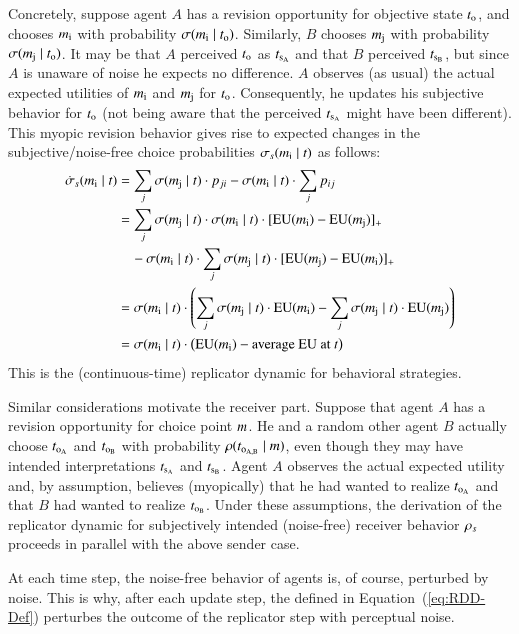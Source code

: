 \documentclass[fleqn,reqno,10pt]{article}
\newcommand{\rdd}{\acro{rdd}} %
\begin{document}
Concretely, suppose agent $A$ has a revision opportunity for objective
state $t_{\mathrm{o}}$, and chooses $m_{\mathrm{i}}$ with probability
$\sigma(m_{\mathrm{i}} \mid t_{\mathrm{o}})$. Similarly, $B$ chooses
$m_{\mathrm{j}}$ with probability $\sigma(m_{\mathrm{j}} \mid
t_{\mathrm{o}})$. It may be that $A$ perceived $t_{\mathrm{o}}$ as
$t_{\mathrm{s_A}}$ and that $B$ perceived $t_{\mathrm{s_B}}$, but since $A$
is unaware of noise he expects no difference. $A$ observes (as usual)
the actual expected utilities of $m_{\mathrm{i}}$ and $m_{\mathrm{j}}$ for
$t_{\mathrm{o}}$. Consequently, he updates his subjective behavior for
$t_{\mathrm{o}}$ (not being aware that the perceived $t_{\mathrm{s_A}}$
might have been different). This myopic revision behavior gives rise
to expected changes in the subjective/noise-free choice probabilities
$\sigma_s(m_{\mathrm{i}} \mid t)$ as follows:
\begin{align*}
  \dot{\sigma}_s(m_{\mathrm{i}} \mid t) & = \sum_j
  \sigma(m_{\mathrm{j}} \mid t) \cdot p_{ji} -  
  \sigma(m_{\mathrm{i}} \mid t) \cdot \sum_j p_{ij} \\
  & = \sum_j  \sigma(m_{\mathrm{j}} \mid t) \cdot
    \sigma(m_{\mathrm{i}} \mid t) \cdot [\mathrm{EU}(m_{\mathrm{i}}) -
    \mathrm{EU}(m_{\mathrm{j}})]_+ \\ 
   & \ \ \ \  - \sigma(m_{\mathrm{i}} \mid t) \cdot \sum_j
   \sigma(m_{\mathrm{j}} \mid t) \cdot [\mathrm{EU}(m_{\mathrm{j}}) -
    \mathrm{EU}(m_{\mathrm{i}})]_+ \\
   & = \sigma(m_{\mathrm{i}} \mid t) \cdot \left ( \sum_j
     \sigma(m_{\mathrm{j}} \mid t) \cdot \mathrm{EU}(m_{\mathrm{i}}) - \sum_j
     \sigma(m_{\mathrm{j}} \mid t) \cdot \mathrm{EU}(m_{\mathrm{j}})
   \right ) \\
   & = \sigma(m_{\mathrm{i}} \mid t) \cdot \left (
     \mathrm{EU}(m_{\mathrm{i}}) - \text{average EU at $t$} \right )
\end{align*}
This is the (continuous-time) replicator dynamic for behavioral
strategies.

Similar considerations motivate the receiver part. Suppose that agent
$A$ has a revision opportunity for choice point $m$. He and a
random other agent $B$ actually choose $t_{\mathrm{o_A}}$ and
$t_{\mathrm{o_B}}$ with probability $\rho(t_{\mathrm{o_{A,B}}} \mid
m)$, even though they may have intended interpretations
$t_{\mathrm{s_A}}$ and $t_{\mathrm{s_B}}$. Agent $A$ observes the actual
expected utility and, by assumption, believes (myopically) that he had
wanted to realize $t_{\mathrm{o_A}}$ and that $B$ had wanted to realize
$t_{\mathrm{o_B}}$. Under these assumptions, the derivation of the
replicator dynamic for subjectively intended (noise-free) receiver
behavior $\rho_s$ proceeds in parallel with the above sender case.

At each time step, the noise-free behavior of agents is, of course, perturbed by noise. This is
why, after each update step, the \rdd defined in Equation~(\ref{eq:RDD-Def}) perturbes the
outcome of the replicator step with perceptual noise.


\printbibliography[heading=bibintoc]
\end{document}

